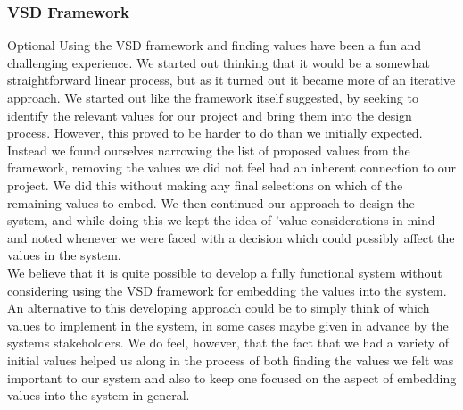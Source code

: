 \subsubsection*{VSD Framework} Optional\newline
Using the VSD framework and finding values have been a fun and challenging experience. We started out thinking that it would be a somewhat straightforward linear process, but as it turned out it became more of an iterative approach. We started out like the framework itself suggested, by seeking to identify the relevant values for our project and bring them into the design process. However, this proved to be harder to do than we initially expected. Instead we found ourselves narrowing the list of proposed values from the framework, removing the values we did not feel had an inherent connection to our project. We did this without making any final selections on which of the remaining values to embed. We then continued our approach to design the system, and while doing this we kept the idea of 'value considerations in mind and noted whenever we were faced with a decision which could possibly affect the values in the system. \\
We believe that it is quite possible to develop a fully functional system without considering using the VSD framework for embedding the values into the system. An alternative to this developing approach could be to simply think of which values to implement in the system, in some cases maybe given in advance by the systems stakeholders. We do feel, however, that the fact that we had a variety of initial values helped us along in the process of both finding the values we felt was important to our system and also to keep one focused on the aspect of embedding values into the system in general.